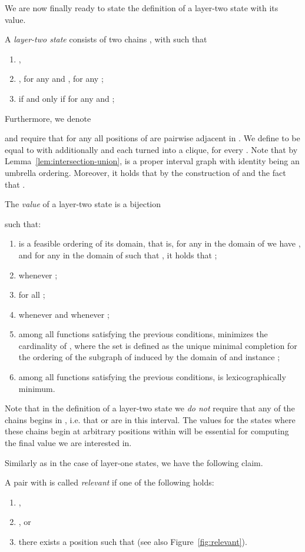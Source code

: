 We are now finally ready to state the definition of a layer-two state with its value.
\begin{definition}
A \emph{layer-two state} consists of two chains ,  with  such that
\begin{enumerate}
\item ,
\item ,  for any  and ,  for any ;
\item  if and only if  for any  and ;
\end{enumerate}
Furthermore, we denote

and require that for any  all positions of  are pairwise adjacent in .
We define  to be equal to  with additionally  and each  turned into a clique, for every .
Note that by Lemma~\ref{lem:intersection-union},  is a proper interval graph with identity being an umbrella ordering. Moreover, it holds that  by the construction of  and the fact that .

The \emph{value} of a layer-two state  is a bijection

such that:
\begin{enumerate}
\item  is a feasible ordering of its domain, that is,
for any  in the domain of  we have , and
  for any  in the domain of  such that , it holds that
  ;
\item  whenever ;
\item  for all ;
\item  whenever  and  whenever ;\label{p:layer-two-last}
\item among all functions  satisfying the previous conditions,  minimizes the cardinality
of ,
where the set  is defined as the unique minimal completion for the ordering  of the subgraph of  induced by the domain of 
and \spic{} instance ;\label{p:layer-two-min}
\item among all functions  satisfying the previous conditions, 
 is lexicographically minimum.
\end{enumerate}
\end{definition}

Note that in the definition of a layer-two state we {\em{do not}} require that any of the chains begins in , i.e. that  or  are in this interval. The values for the states where these chains begin at arbitrary positions within  will be essential for computing the final value we are interested in.

Similarly as in the case of layer-one states, we have the following claim.
\begin{definition}
A pair  with  is called
\emph{relevant} if one of the following holds:
\begin{enumerate}
\item ,
\item , or
\item there exists a position 
such that 
(see also Figure~\ref{fig:relevant}).
\end{enumerate}
\end{definition}


